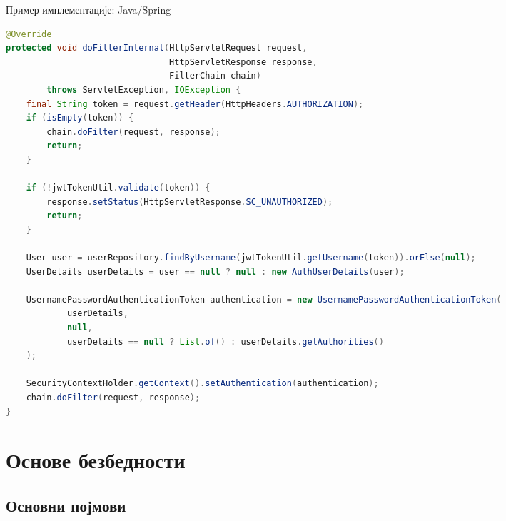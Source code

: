 \documentclass[aspectratio=169]{beamer}
\begin{document}
    \begin{frame}[fragile]{Пример имплементације: Java/Spring}
        \begin{adjustbox}{width=\textwidth,height=0.4\textheight,keepaspectratio}
            \begin{lstlisting}[language=java]
@Override
protected void doFilterInternal(HttpServletRequest request,
                                HttpServletResponse response,
                                FilterChain chain)
        throws ServletException, IOException {
    final String token = request.getHeader(HttpHeaders.AUTHORIZATION);
    if (isEmpty(token)) {
        chain.doFilter(request, response);
        return;
    }

    if (!jwtTokenUtil.validate(token)) {
        response.setStatus(HttpServletResponse.SC_UNAUTHORIZED);
        return;
    }

    User user = userRepository.findByUsername(jwtTokenUtil.getUsername(token)).orElse(null);
    UserDetails userDetails = user == null ? null : new AuthUserDetails(user);

    UsernamePasswordAuthenticationToken authentication = new UsernamePasswordAuthenticationToken(
            userDetails,
            null,
            userDetails == null ? List.of() : userDetails.getAuthorities()
    );

    SecurityContextHolder.getContext().setAuthentication(authentication);
    chain.doFilter(request, response);
}
            \end{lstlisting}
        \end{adjustbox}
    \end{frame}
    
    \section{Основе безбедности}
    \subsection[]{Основни појмови}
    
\end{document}
